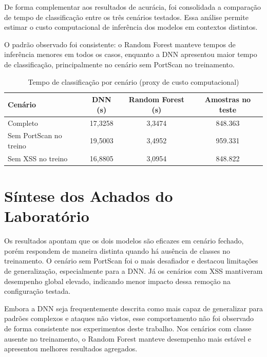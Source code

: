 \documentclass[12pt,oneside]{abntex2}
\begin{document}
De forma complementar aos resultados de acurácia, foi consolidada a comparação de tempo de classificação entre os três cenários testados. Essa análise permite estimar o custo computacional de inferência dos modelos em contextos distintos.

O padrão observado foi consistente: o Random Forest manteve tempos de inferência menores em todos os casos, enquanto a DNN apresentou maior tempo de classificação, principalmente no cenário sem PortScan no treinamento.

\begin{table}[htb]
\centering
\caption{Tempo de classificação por cenário (proxy de custo computacional)}
\label{tab:tempos_cenarios}
\begin{tabular}{|l|c|c|c|}
\hline
\textbf{Cenário} & \textbf{DNN (s)} & \textbf{Random Forest (s)} & \textbf{Amostras no teste} \\
\hline
Completo & 17,3258 & 3,3474 & 848.363 \\
\hline
Sem PortScan no treino & 19,5003 & 3,4952 & 959.331 \\
\hline
Sem XSS no treino & 16,8805 & 3,0954 & 848.822 \\
\hline
\end{tabular}
\end{table}

\section{Síntese dos Achados do Laboratório}

Os resultados apontam que os dois modelos são eficazes em cenário fechado, porém respondem de maneira distinta quando há ausência de classes no treinamento. O cenário sem PortScan foi o mais desafiador e destacou limitações de generalização, especialmente para a DNN. Já os cenários com XSS mantiveram desempenho global elevado, indicando menor impacto dessa remoção na configuração testada.

Embora a DNN seja frequentemente descrita como mais capaz de generalizar para padrões complexos e ataques não vistos, esse comportamento não foi observado de forma consistente nos experimentos deste trabalho. Nos cenários com classe ausente no treinamento, o Random Forest manteve desempenho mais estável e apresentou melhores resultados agregados.

\postextual
\nocite{*}
\printbibliography[title={REFERÊNCIAS BIBLIOGRÁFICAS}]
\end{document}
